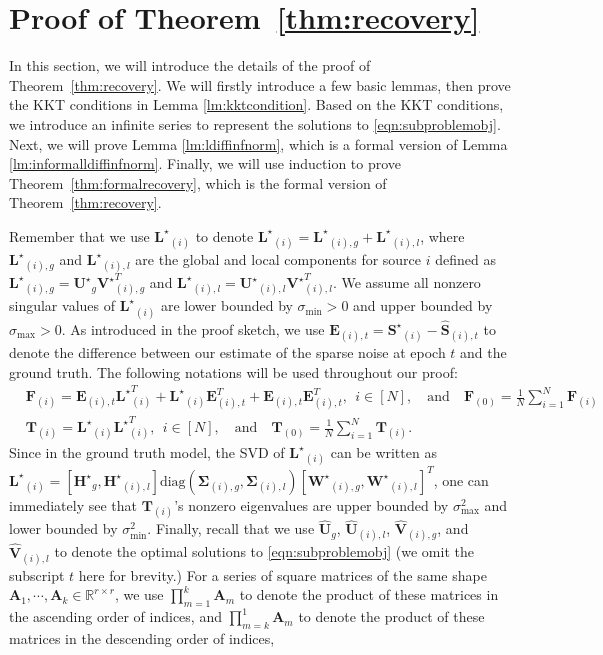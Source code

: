 \documentclass[twoside,11pt]{article}
\newcommand{\matA}{\mathbf{A}}
\newcommand{\matE}{\mathbf{E}}
\newcommand{\matF}{\mathbf{F}}
\newcommand{\matHst}{{\mathbf{H}^\star}}
\newcommand{\matLst}{{\mathbf{L}^\star}}
\newcommand{\matSigma}{\mathbf{\Sigma}}
\newcommand{\matT}{\mathbf{T}}
\newcommand{\matSst}{{\mathbf{S}^\star}}
\newcommand{\matUst}{{\mathbf{U}^\star}}
\newcommand{\matVst}{{\mathbf{V}^\star}}
\newcommand{\matWst}{{\mathbf{W}^\star}}
\newcommand{\hmatS}{\hat{\mathbf{S}}}
\newcommand{\hmatU}{\hat{\mathbf{U}}}
\newcommand{\hmatV}{\hat{\mathbf{V}}}
\newcommand{\gop}{\sigma_{\max}}
\newcommand{\sm}{\sigma_{\min}}
\newcommand{\sms}{\sigma_{\min}^2}
\begin{document}
\section{Proof of Theorem~\ref{thm:recovery}}
\label{sec:proofofrecovery}
 In this section, we will introduce the details of the proof of Theorem~\ref{thm:recovery}. We will firstly introduce a few basic lemmas, then prove the KKT conditions in Lemma \ref{lm:kktcondition}. Based on the KKT conditions, we introduce an infinite series to represent the solutions to \eqref{eqn:subproblemobj}. Next, we will prove Lemma \ref{lm:ldiffinfnorm}, which is a formal version of Lemma \ref{lm:informalldiffinfnorm}. Finally, we will use induction to prove Theorem~\ref{thm:formalrecovery}, which is the formal version of Theorem~\ref{thm:recovery}.
 
 Remember that we use $\matLst_{(i)}$ to denote $\matLst_{(i)}=\matLst_{(i),g}+\matLst_{(i),l}$, where $\matLst_{(i),g}$ and $\matLst_{(i),l}$ are the global and local components for source $i$ defined as
$\matLst_{(i),g}=\matUst_{g}\matVst_{(i),g}^T$ and $\matLst_{(i),l}=\matUst_{(i),l}\matVst_{(i),l}^T$. We assume all nonzero singular values of $\matLst_{(i)}$ are lower bounded by $\sm>0$ and upper bounded by $\gop>0$. As introduced in the proof sketch, we use $\matE_{(i),t}=\matSst_{(i)}-\hmatS_{(i),t}$ to denote the difference between our estimate of the sparse noise at epoch $t$ and the ground truth. The following notations will be used throughout our proof:
\begin{align}
&\matF_{(i)}=\matE_{(i),t}\matLst_{(i)}^T+\matLst_{(i)}\matE_{(i),t}^T+\matE_{(i),t}\matE_{(i),t}^T, \ \ i\in[N],\quad \text{and}\quad  \matF_{(0)}=\frac{1}{N}\sum_{i=1}^N\matF_{(i)}\label{eq_F}\\
&    \matT_{(i)}=\matLst_{(i)}\matLst_{(i)}^T, \ \ i\in[N],\quad \text{and}\quad  \matT_{(0)}=\frac{1}{N}\sum_{i=1}^N\matT_{(i)}.
\end{align}
Since in the ground truth model, the SVD of $\matLst_{(i)}$ can be written as $\matLst_{(i)}=\left[\matHst_g,\matHst_{(i),l}\right]\text{diag}(\matSigma_{(i),g},\matSigma_{(i),l})\left[\matWst_{(i),g},\matWst_{(i),l} \right]^T$, one can immediately see that $\matT_{(i)}$'s nonzero eigenvalues are upper bounded by $\gop^2$ and lower bounded by $\sms$. Finally, recall that we use $\hmatU_{g}$, $\hmatU_{(i),l}$, $\hmatV_{(i),g}$, and $\hmatV_{(i),l}$ to denote the optimal solutions to \eqref{eqn:subproblemobj} (we omit the subscript $t$ here for brevity.) For a series of square matrices of the same shape $\matA_1,\cdots, \matA_k\in \mathbb{R}^{r\times r}$, we use $\prod_{m=1}^k\matA_m$ to denote the product of these matrices in the ascending order of indices, and $\prod_{m=k}^1\matA_m$ to denote the product of these matrices in the descending order of indices,
\end{document}
